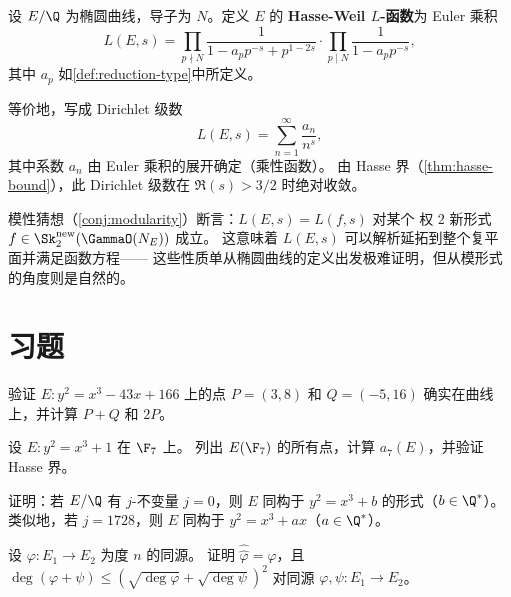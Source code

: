 \begin{definition}
\label{def:hasse-weil-l}
设 $E/\Q$ 为椭圆曲线，导子为 $N$。定义 $E$ 的 \textbf{Hasse-Weil $L$-函数}为
Euler 乘积
\[
  L(E, s) = \prod_{p \nmid N} \frac{1}{1 - a_p p^{-s} + p^{1-2s}}
  \cdot \prod_{p \mid N} \frac{1}{1 - a_p p^{-s}},
\]
其中 $a_p$ 如\cref{def:reduction-type}中所定义。

等价地，写成 Dirichlet 级数
\[
  L(E, s) = \sum_{n=1}^{\infty} \frac{a_n}{n^s},
\]
其中系数 $a_n$ 由 Euler 乘积的展开确定（乘性函数）。
由 Hasse 界（\cref{thm:hasse-bound}），此 Dirichlet 级数在
$\Re(s) > 3/2$ 时绝对收敛。
\end{definition}

\begin{remark}
\label{rem:modularity-l-function}
模性猜想（\cref{conj:modularity}）断言：$L(E, s) = L(f, s)$ 对某个
权 $2$ 新形式 $f \in \Sk_2^{\mathrm{new}}(\GammaO(N_E))$ 成立。
这意味着 $L(E, s)$ 可以解析延拓到整个复平面并满足函数方程——
这些性质单从椭圆曲线的定义出发极难证明，但从模形式的角度则是自然的。
\end{remark}


\section{习题}
\label{sec:ch2-exercises}

\begin{exercise}
\label{ex:ch2-1}
验证 $E\colon y^2 = x^3 - 43x + 166$ 上的点 $P = (3, 8)$ 和
$Q = (-5, 16)$ 确实在曲线上，并计算 $P + Q$ 和 $2P$。
\end{exercise}

\begin{exercise}
\label{ex:ch2-2}
设 $E\colon y^2 = x^3 + 1$ 在 $\F_7$ 上。
列出 $E(\F_7)$ 的所有点，计算 $a_7(E)$，并验证 Hasse 界。
\end{exercise}

\begin{exercise}
\label{ex:ch2-3}
证明：若 $E/\Q$ 有 $j$-不变量 $j = 0$，则 $E$ 同构于
$y^2 = x^3 + b$ 的形式（$b \in \Q^*$）。
类似地，若 $j = 1728$，则 $E$ 同构于 $y^2 = x^3 + ax$（$a \in \Q^*$）。
\end{exercise}

\begin{exercise}
\label{ex:ch2-4}
设 $\varphi\colon E_1 \to E_2$ 为度 $n$ 的同源。
证明 $\hat{\hat{\varphi}} = \varphi$，且 $\deg(\varphi + \psi) \leq
(\sqrt{\deg \varphi} + \sqrt{\deg \psi})^2$ 对同源 $\varphi, \psi\colon E_1 \to E_2$。
\end{exercise}

